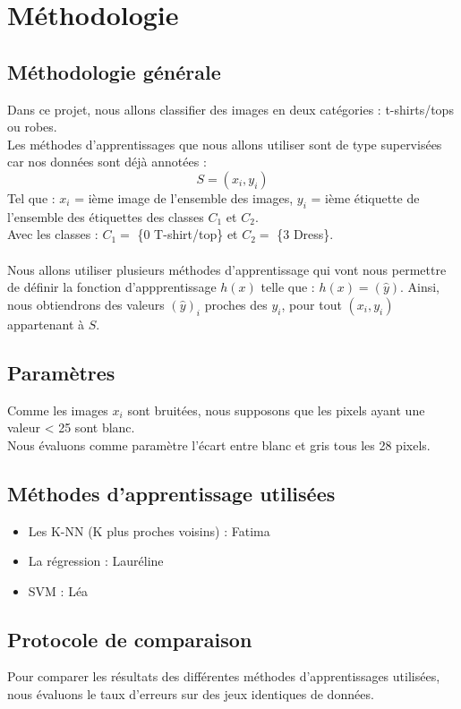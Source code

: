 \documentclass[a4paper,11pt]{article}
\begin{document}
\newpage
\section{Méthodologie}
	\subsection{Méthodologie générale}
		Dans ce projet, nous allons classifier des images en deux catégories : t-shirts/tops ou robes.\\
		Les méthodes d'apprentissages que nous allons utiliser sont de type supervisées car nos données sont déjà annotées :
		$$ S = {(x_i, y_i)} $$
		Tel que : $x_i$ = ième image de l'ensemble des images, $y_i$ = ième étiquette de l'ensemble des étiquettes des classes $C_1$ et $C_2$.\\
		Avec les classes : $C_1 =$ \{0 T-shirt/top\} et $C_2 =$ \{3 Dress\}.\\
		\\
		Nous allons utiliser plusieurs méthodes d’apprentissage qui vont nous permettre de définir la fonction d'appprentissage $h(x)$ telle que : $h(x) = (\hat y)$. Ainsi, nous obtiendrons des valeurs $(\hat y)_i$ proches des $y_i$, pour tout $(x_i, y_i)$ appartenant à $S$.\\

	\subsection{Paramètres}
		Comme les images $x_i$ sont bruitées, nous supposons que les pixels ayant une valeur < 25 sont blanc.\\
		Nous évaluons comme paramètre l'écart entre blanc et gris tous les 28 pixels.

	\subsection{Méthodes d'apprentissage utilisées}
		\begin{itemize}
			\item Les K-NN (K plus proches voisins) : Fatima
			\item La régression : Lauréline
			\item SVM : Léa
		\end{itemize}

	\subsection{Protocole de comparaison}
		Pour comparer les résultats des différentes méthodes d'apprentissages utilisées, nous évaluons le taux d’erreurs sur des jeux identiques de données.
\end{document}
